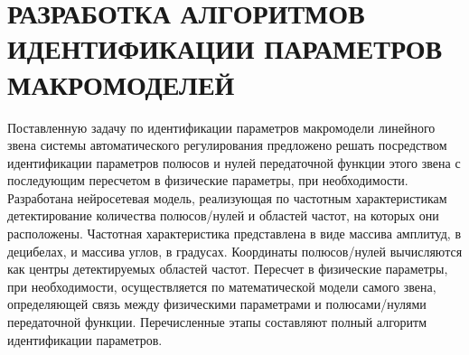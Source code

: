 \chapter{РАЗРАБОТКА АЛГОРИТМОВ ИДЕНТИФИКАЦИИ ПАРАМЕТРОВ МАКРОМОДЕЛЕЙ}

Поставленную задачу по идентификации параметров макромодели линейного звена системы автоматического регулирования предложено решать посредством идентификации параметров полюсов и нулей передаточной функции этого звена с последующим пересчетом в физические параметры, при необходимости. Разработана нейросетевая модель, реализующая по частотным характеристикам детектирование количества полюсов/нулей и областей частот, на которых они расположены. Частотная характеристика представлена в виде массива амплитуд, в децибелах, и массива углов, в градусах. Координаты полюсов/нулей вычисляются как центры детектируемых областей частот. Пересчет в физические параметры, при необходимости, осуществляется по математической модели самого звена, определяющей связь между физическими параметрами и полюсами/нулями передаточной функции. Перечисленные этапы составляют полный алгоритм идентификации параметров.




